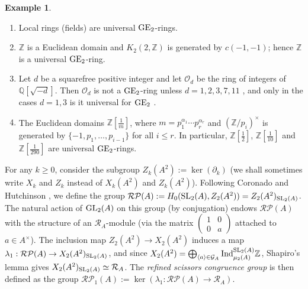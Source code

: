 \documentclass[11pt]{amsart}
\theoremstyle{definition}
\theoremstyle{plain}
\theoremstyle{definition}
\newtheorem{exm}[ntn]{Example}
\numberwithin{equation}{section}
\newcommand{\z}{\mathbb{Z}}
\newcommand{\q}{\mathbb{Q}}
\newcommand{\GG}{\mathcal{G}}
\newcommand{\RR}{\mathcal{R}}
\newcommand{\RP}{\mathcal{RP}}
\renewcommand{\aa}{{A^\times}}
\newcommand{\half}{{\left[\frac{1}{2}\right]}}
\newcommand{\lan}{\langle}
\newcommand{\ran}{\rangle}
\newcommand{\GE}{{\rm GE}}
\newcommand{\Ind}{{\rm Ind}}
\newcommand{\GL}{\mathit{{\rm GL}}}
\newcommand{\SL}{\mathit{{\rm SL}}}
\newcommand{\mtxx}[4]
{\left(\!\!
	\begin{array}{cc}
		\!\!#1 & \!\!#2\\
		\!\!#3 & \!\!#4
	\end{array}\!\!
	\right)}
\begin{document}
	\begin{exm}
		\begin{enumerate}
			\item \cite[\S 4]{cohn1966} Local rings (fields) are universal $\GE_2$-rings.
			\item \cite[Example 4.7]{C-H2022} $\z$ is a Euclidean domain and $K_2(2,\z)$ is generated by $c(-1,-1)$; hence $\z$ is a universal $\GE_2$-ring.
			\item Let $d$ be a squarefree positive integer and let $\mathcal{O}_d$ be the ring of integers of $\q[\sqrt{-d}]$. Then $\mathcal{O}_d$ is not a $\GE_2$-ring unless $d=1,2,3,7,11$ \cite[Theorem 6.1]{cohn1966}, and only in the cases $d=1,3$ is it universal for $\GE_2$ \cite[Remarks]{cohn1968}.
			\item \cite[Example 4.8]{C-H2022} The Euclidean domains $\z\left[\frac{1}{m}\right]$, where $m=p_1^{\alpha_1}\cdots p_r^{\alpha_r}$ and $(\z/p_i)^\times$ is generated by $\{-1,p_1,\dots,p_{i-1}\}$ for all $i\leq r$. In particular, $\z\half$, $\z\left[\frac{1}{10}\right]$ and $\z\left[\frac{1}{290}\right]$ are universal $\GE_2$-rings.
		\end{enumerate}
	\end{exm}
	
	For any $k\geq 0$, consider the subgroup $Z_k(A^2):=\ker(\partial_k)$ (we shall sometimes write $X_k$ and $Z_k$ instead of $X_k(A^2)$ and $Z_k(A^2)$). Following Coronado and Hutchinson \cite{C-H2022}, we define the group $\RP(A):=H_0(\SL_2(A),Z_2(A^2))=Z_2(A^2)_{\SL_2(A)}$. The natural action of $\GL_2(A)$ on this group (by conjugation) endows $\RP(A)$ with the structure of an $\RR_A$-module (via the matrix $\mtxx{1}{0}{0}{a}$ attached to $a\in\aa$). The inclusion map $Z_2(A^2)\to X_2(A^2)$ induces a map $\lambda_1:\RP(A)\to X_2(A^2)_{\SL_2(A)}$, and since $X_2(A^2)=\bigoplus_{\lan a\ran\in\GG_A}\Ind_{\mu_2(A)}^{\SL_2(A)}\z$, Shapiro's lemma gives $X_2(A^2)_{\SL_2(A)}\simeq\RR_A$. The \textit{refined scissors congruence group} is then defined as the group $\RP_1(A):=\ker(\lambda_1:\RP(A)\to\RR_A)$. 
	
\end{document}
